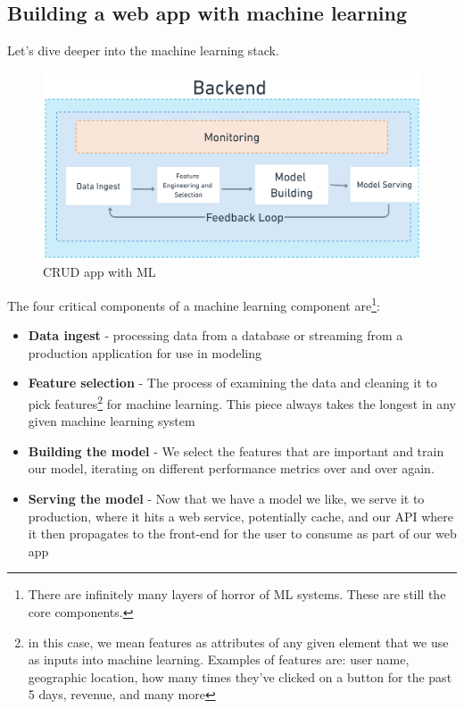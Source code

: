 \documentclass[11pt]{diazessay} %
\begin{document}
\subsection{Building a web app with machine learning}
Let's dive deeper into the machine learning stack. 

\begin{figure}[!ht]
\centering
\includegraphics[width=.75\textwidth]{figures/ml_system.png}
\caption{CRUD app with ML}
\end{figure}

The four critical components of a machine learning component are\footnote{There are infinitely many layers of horror of ML systems\citep{kreuzberger2022machine}. These are still the core components. }:

\begin{itemize}
  \item \textbf{Data ingest} - processing data from a database or streaming from a production application for use in modeling
  \item \textbf{Feature selection} - The process of examining the data and cleaning it to pick features\footnote{in this case, we mean features as attributes of any given element that we use as inputs into machine learning. Examples of features are: user name, geographic location, how many times they've clicked on a button for the past 5 days, revenue, and many more} for machine learning. This piece always takes the longest in any given machine learning system
  \item \textbf{Building the model} - We select the features that are important and train our model, iterating on different performance metrics over and over again.
  \item \textbf{Serving the model} - Now that we have a model we like, we serve it to production, where it hits a web service, potentially cache, and our API where it then propagates to the front-end for the user to consume as part of our web app
\end{itemize}
\end{document}
